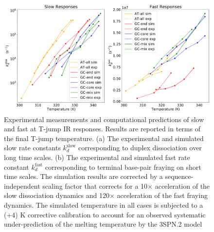 \documentclass[journal=jpcbfk,manuscript=article]{achemso}
\begin{document}
\begin{figure}[ht!]
	\begin{center}
        \includegraphics[width=\textwidth]{Fig1.pdf}
        \caption{Experimental measurements and computational predictions of slow and fast at T-jump IR responses. Results are reported in terms of the final T-jump temperature. (a) The experimental and simulated slow rate constants $k_d^\mathrm{slow}$ corresponding to duplex dissociation over long time scales. (b) The experimental and simulated fast rate constant $k_d^\mathrm{fast}$ corresponding to terminal base-pair fraying on short time scales. The simulation results are corrected by a sequence-independent scaling factor that corrects for a 10$\times$ acceleration of the slow dissociation dynamics and 120$\times$ acceleration of the fast fraying dynamics. The simulated temperature in all cases is subjected to a (+4) K corrective calibration to account for an observed systematic under-prediction of the melting temperature by the 3SPN.2 model}
        \label{fig:relaxation-comparison}
	\end{center}
\end{figure}
\end{document}
